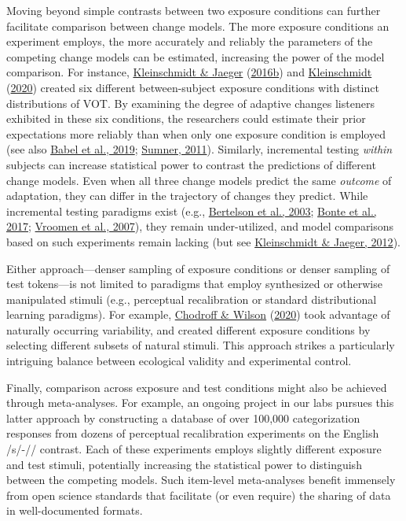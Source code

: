 \documentclass[
  11pt,
  english,
  man,floatsintext]{apa6}
\begin{document}
Moving beyond simple contrasts between two exposure conditions can further facilitate comparison between change models. The more exposure conditions an experiment employs, the more accurately and reliably the parameters of the competing change models can be estimated, increasing the power of the model comparison. For instance, \protect\hyperlink{ref-kleinschmidt-jaeger2016cogsci}{Kleinschmidt \& Jaeger} (\protect\hyperlink{ref-kleinschmidt-jaeger2016cogsci}{2016b}) and \protect\hyperlink{ref-kleinschmidt2020}{Kleinschmidt} (\protect\hyperlink{ref-kleinschmidt2020}{2020}) created six different between-subject exposure conditions with distinct distributions of VOT. By examining the degree of adaptive changes listeners exhibited in these six conditions, the researchers could estimate their prior expectations more reliably than when only one exposure condition is employed (see also \protect\hyperlink{ref-babel2019}{Babel et al., 2019}; \protect\hyperlink{ref-sumner2011}{Sumner, 2011}). Similarly, incremental testing \emph{within} subjects can increase statistical power to contrast the predictions of different change models. Even when all three change models predict the same \emph{outcome} of adaptation, they can differ in the trajectory of changes they predict. While incremental testing paradigms exist (e.g., \protect\hyperlink{ref-bertelson2003}{Bertelson et al., 2003}; \protect\hyperlink{ref-bonte2017}{Bonte et al., 2017}; \protect\hyperlink{ref-vroomen2007}{Vroomen et al., 2007}), they remain under-utilized, and model comparisons based on such experiments remain lacking (but see \protect\hyperlink{ref-kleinschmidt-jaeger2012}{Kleinschmidt \& Jaeger, 2012}).

Either approach---denser sampling of exposure conditions or denser sampling of test tokens---is not limited to paradigms that employ synthesized or otherwise manipulated stimuli (e.g., perceptual recalibration or standard distributional learning paradigms). For example, \protect\hyperlink{ref-chodroff-wilson2020}{Chodroff \& Wilson} (\protect\hyperlink{ref-chodroff-wilson2020}{2020}) took advantage of naturally occurring variability, and created different exposure conditions by selecting different subsets of natural stimuli. This approach strikes a particularly intriguing balance between ecological validity and experimental control.

Finally, comparison across exposure and test conditions might also be achieved through meta-analyses. For example, an ongoing project in our labs pursues this latter approach by constructing a database of over 100,000 categorization responses from dozens of perceptual recalibration experiments on the English /s/-// contrast. Each of these experiments employs slightly different exposure and test stimuli, potentially increasing the statistical power to distinguish between the competing models. Such item-level meta-analyses benefit immensely from open science standards that facilitate (or even require) the sharing of data in well-documented formats.
\end{document}
